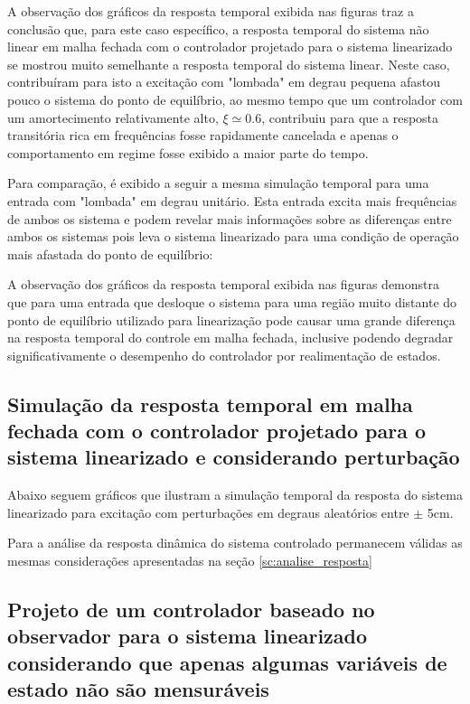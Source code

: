    
    A observação dos gráficos da resposta temporal exibida nas figuras  traz a conclusão que, para este caso específico, a resposta temporal do sistema não linear em malha fechada com o controlador projetado para o sistema linearizado se mostrou muito semelhante a resposta temporal do sistema linear. Neste caso, contribuíram para isto a excitação com "lombada" em degrau pequena afastou pouco o sistema do ponto de equilíbrio, ao mesmo tempo que um controlador com um amortecimento relativamente alto, $\xi \simeq 0.6$, contribuiu para que a resposta transitória rica em frequências fosse rapidamente cancelada e apenas o comportamento em regime fosse exibido a maior parte do tempo.
    
    Para comparação, é exibido a seguir a mesma simulação temporal para uma entrada com "lombada" em degrau unitário. Esta entrada excita mais frequências de ambos os sistema e podem revelar mais informações sobre as diferenças entre ambos os sistemas pois leva o sistema linearizado para uma condição de operação mais afastada do ponto de equilíbrio: 
    
    A observação dos gráficos da resposta temporal exibida nas figuras demonstra que para uma entrada que desloque o sistema para uma região muito distante do ponto de equilíbrio utilizado para linearização pode causar uma grande diferença na resposta temporal do controle em malha fechada, inclusive podendo degradar significativamente o desempenho do controlador por realimentação de estados.  
        \subsection{Simulação da resposta temporal em malha fechada com o controlador projetado para o sistema linearizado e considerando perturbação}
 
    Abaixo seguem gráficos que ilustram a simulação temporal da resposta do sistema linearizado para excitação com perturbações em degraus aleatórios entre $\pm$ 5cm.

    Para a análise da resposta dinâmica do sistema controlado permanecem válidas as mesmas considerações apresentadas na seção \ref{sc:analise_resposta}

        \subsection{Projeto de um controlador baseado no observador para o sistema linearizado considerando
        que apenas algumas variáveis de estado não são mensuráveis}


